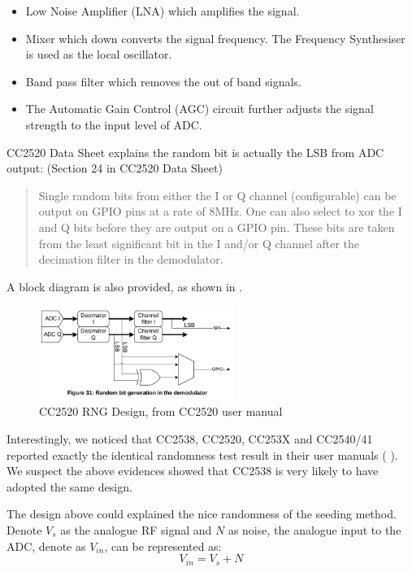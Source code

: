 \begin{itemize}
	\item Low Noise Amplifier (LNA) which amplifies the signal.
	\item Mixer which down converts the signal frequency. The Frequency Synthesiser is used as the local oscillator.
	\item Band pass filter which removes the out of band signals.
	\item The Automatic Gain Control (AGC) circuit further adjusts the signal strength to the input level of ADC.
\end{itemize}

CC2520 Data Sheet\cite{CC2520Manual} explains the random bit is actually the LSB from ADC output: (Section 24 in CC2520 Data Sheet\cite{CC2520Manual})
\begin{quote}
Single random bits from either the I or Q channel (configurable) can be output on GPIO pins at a rate of 8MHz. One can also select to xor the I and Q bits before they are output on a GPIO pin. These bits are taken from the least significant bit in the I and/or Q channel after the decimation filter in the demodulator.
\end{quote}

A block diagram is also provided, as shown in .
\begin{figure}[!t]
\centering
\includegraphics[width=2.5in]{fig/CC2520_RNG.png}
\caption{CC2520 RNG Design, from CC2520 user manual\cite{CC2520Manual}}
\label{CC2520RFRND}
\end{figure}

Interestingly, we noticed that CC2538, CC2520, CC253X and CC2540/41 reported exactly the identical randomness test result in their user manuals (\cite{CC2538Manual} \cite{ CC2520Manual} \cite{CC2530Manual}). We suspect the above evidences showed that CC2538 is very likely to have adopted the same design.

The design above could explained the nice randomness of the seeding method. Denote $V_s$ as the analogue RF signal and $N$ as noise, the analogue input to the ADC, denote as  $V_{in}$, can be represented as:
\begin{equation} \label{V_in}
V_{in} = V_s + N
\end{equation}

